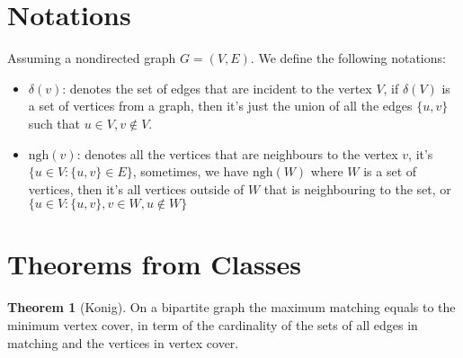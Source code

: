 \documentclass[]{article}
\theoremstyle{definition}
\newtheorem{theorem}{Theorem}       %
\begin{document}
\section{Notations}
Assuming a nondirected graph $G = (V, E)$. We define the following notations: 
\begin{itemize}
    \item [1.] $\delta(v)$: denotes the set of edges that are incident to the vertex $V$, if $\delta(V)$ is a set of vertices from a graph, then it's just the union of all the edges $\{u, v\}$ such that $u\in V, v\not\in V$. 
    \item [2.] $\text{ngh}(v)$: denotes all the vertices that are neighbours to the vertex $v$, it's $\{u\in V: \{u, v\} \in E\}$, sometimes, we have $\text{ngh}(W)$ where $W$ is a set of vertices, then it's all vertices outside of $W$ that is neighbouring to the set, or $\{u\in V: \{u, v\}, v\in W, u \not\in W\}$
\end{itemize}
\section{Theorems from Classes}
    \begin{theorem}[Konig]\label{theorem:konig}
        On a bipartite graph the maximum matching equals to the minimum vertex cover, in term of the cardinality of the sets of all edges in matching and the vertices in vertex cover.  
    \end{theorem}
\end{document}
